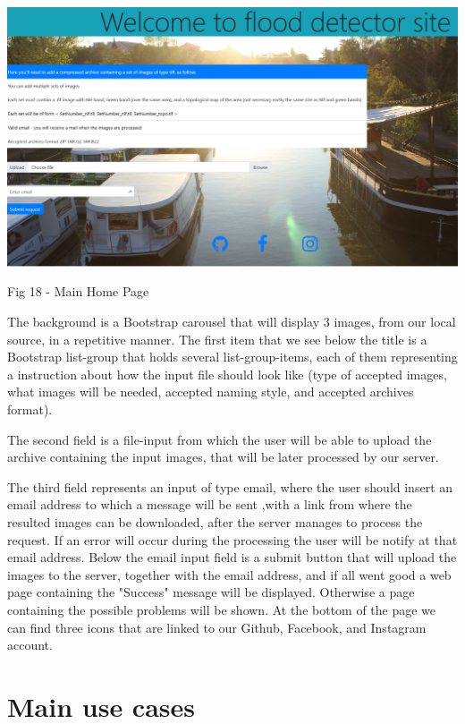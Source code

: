 \documentclass[12pt, a4paper]{report}
\begin{document}
\bigskip
\includegraphics[scale=0.4, center]{gui_homepage.png}
\begin{center}
Fig 18 - Main Home Page 
\end{center}
\par 

The background is a Bootstrap carousel that will display 3 images, from our local source, in a repetitive manner. The first item that we see below the title is a Bootstrap list-group that holds several list-group-items, each of them representing a instruction about how the input file should look like (type of accepted images, what images will be needed, accepted naming style, and accepted archives format).
\par 

The second field is a file-input from which the user will be able to upload the archive containing the input images, that will be later processed by our server.
\par 

The third field represents an input of type email, where the user should insert an email address to which a message will be sent ,with a link from where the resulted images can be downloaded, after the server manages to process the request. If an error will occur during the processing the user will be notify at that email address. Below the email input field is a submit button that will upload the images to the server, together with the email address, and if all went good a web page containing the "Success" message will be displayed. Otherwise a page containing the possible problems will be shown. At the bottom of the page we can find three icons that are linked to our Github, Facebook, and Instagram account.



\section{Main use cases}
\end{document}
